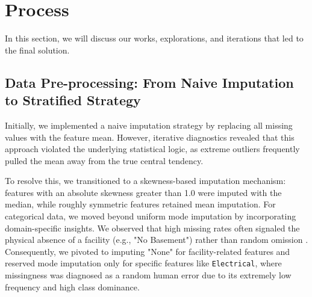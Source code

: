 \documentclass{article}
\begin{document}



\section{Process}
In this section, we will discuss our works, explorations, and iterations that led to the final solution. 

\subsection{Data Pre-processing: From Naive Imputation to Stratified Strategy}
Initially, we implemented a naive imputation strategy by replacing all missing values with the feature mean. However, iterative diagnostics revealed that this approach violated the underlying statistical logic, as extreme outliers frequently pulled the mean away from the true central tendency. 

To resolve this, we transitioned to a skewness-based imputation mechanism: features with an absolute skewness greater than 1.0 were imputed with the median, while roughly symmetric features retained mean imputation. For categorical data, we moved beyond uniform mode imputation by incorporating domain-specific insights. We observed that high missing rates often signaled the physical absence of a facility (e.g., "No Basement") rather than random omission . Consequently, we pivoted to imputing "None" for facility-related features and reserved mode imputation only for specific features like \texttt{Electrical}, where missingness was diagnosed as a random human error due to its extremely low frequency and high class dominance.
\end{document}
